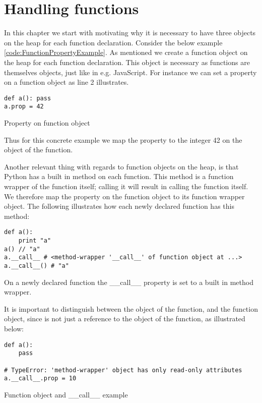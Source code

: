 \chapter{Handling functions}
In this chapter we start with motivating why it is necessary to have three objects on the heap for each function declaration. Consider the below example \ref{code:FunctionPropertyExample}. As mentioned we create a function object on the heap for each function declaration. This object is necessary as functions are themselves objects, just like in e.g. JavaScript. For instance we can set a property on a function object as line 2 illustrates.

\begin{listing}[H]
	\begin{verbatim}
def a(): pass
a.prop = 42
	\end{verbatim}
\caption{Property on function object}\label{code:FunctionPropertyExample}
\end{listing}

Thus for this concrete example we map the property  to the integer 42 on the object of the function.

Another relevant thing with regards to function objects on the heap, is that Python has a built in method  on each function. This method is a function wrapper of the function itself; calling it will result in calling the function itself. We therefore map the property  on the function object to its function wrapper object. The following illustrates how each newly declared function has this method:

\begin{listing}[H]
	\begin{verbatim}
def a():
	print "a"
a() // "a"
a.__call__ # <method-wrapper '__call__' of function object at ...> 
a.__call__() # "a"
	\end{verbatim}
\caption{On a newly declared function the \_\_call\_\_ property is set to a built in method wrapper.}\label{code:printFunctionExample}
\end{listing}

It is important to distinguish between the object of the function, and the function object, since  is not just a reference to the object of the function, as illustrated below:

\begin{listing}[H]
	\begin{verbatim}
def a(): 
	pass

# TypeError: 'method-wrapper' object has only read-only attributes
a.__call__.prop = 10
	\end{verbatim}
\caption{Function object and \_\_call\_\_ example}\label{code:callPropertyExample}
\end{listing}

